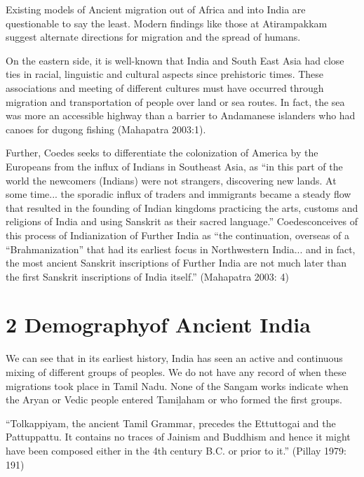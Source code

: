 Existing models of Ancient migration out of Africa and into India are questionable to say the least. Modern findings like those at Atirampakkam suggest alternate directions for migration and the spread of humans.

On the eastern side, it is well-known that India and South East Asia had close ties in racial, linguistic and cultural aspects since prehistoric times. These associations and meeting of different cultures must have occurred through migration and transportation of people over land or sea routes. In fact, the sea was more an accessible highway than a barrier to Andamanese islanders who had canoes for dugong fishing (Mahapatra 2003:1).

\begin{myquote}
Further, Coedes seeks to differentiate the colonization of America by the Europeans from the influx of Indians in Southeast Asia, as “in this part of the world the newcomers (Indians) were not strangers, discovering new lands. At some time... the sporadic influx of traders and immigrants became a steady flow that resulted in the founding of Indian kingdoms practicing the arts, customs and religions of India and using Sanskrit as their sacred language.” Coedesconceives of this process of Indianization of Further India as “the continuation, overseas of a “Brahmanization” that had its earliest focus in Northwestern India... and in fact, the most ancient Sanskrit inscriptions of Further India are not much later than the first Sanskrit inscriptions of India itself.” (Mahapatra 2003: 4)
\end{myquote}


\section*{2 Demographyof Ancient India}

We can see that in its earliest history, India has seen an active and continuous mixing of different groups of peoples. We do not have any record of when these migrations took place in Tamil Nadu. None of the Sangam works indicate when the Aryan or Vedic people entered Tamiḻaham or who formed the first groups.

\begin{myquote}
“Tolkappiyam, the ancient Tamil Grammar, precedes the Ettuttogai and the Pattuppattu. It contains no traces of Jainism and Buddhism and hence it might have been composed either in the 4th century B.C. or prior to it.” (Pillay 1979: 191)
\end{myquote}

